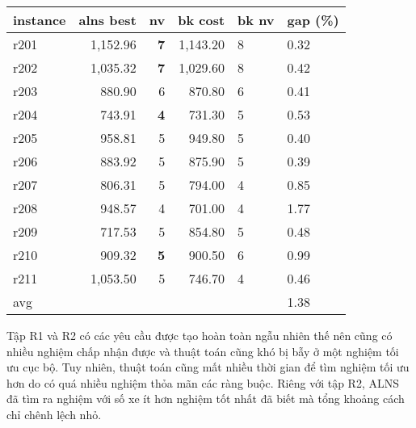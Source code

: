   \begin{table}[caption={Kết quả đo với tập Solomon R2}, label=exp:solomonR2]
    \centering
    \begin{tabular}{lrrrll}
    \hline
    instance & alns best & nv & bk cost & bk nv & gap (\%) \\ \hline
    r201 & 1,152.96 & \textbf{7} & 1,143.20 & 8 & 0.32 \\ \hline
    r202 & 1,035.32 & \textbf{7} & 1,029.60 & 8 & 0.42 \\ \hline
    r203 & 880.90 & 6 & 870.80 & 6 & 0.41 \\ \hline
    r204 & 743.91 & \textbf{4} & 731.30 & 5 & 0.53 \\ \hline
    r205 & 958.81 & 5 & 949.80 & 5 & 0.40 \\ \hline
    r206 & 883.92 & 5 & 875.90 & 5 & 0.39 \\ \hline
    r207 & 806.31 & 5 & 794.00 & 4 & 0.85 \\ \hline
    r208 & 948.57 & 4 & 701.00 & 4 & 1.77 \\ \hline
    r209 & 717.53 & 5 & 854.80 & 5 & 0.48 \\ \hline
    r210 & 909.32 & \textbf{5} & 900.50 & 6 & 0.99 \\ \hline
    r211 & 1,053.50 & 5 & 746.70 & 4 & 0.46 \\ \hline
    avg &  &  &  &  & 1.38 \\ \hline
    \end{tabular}
  \end{table}

  Tập R1 và R2 có các yêu cầu được tạo hoàn toàn ngẫu nhiên thế nên cũng có nhiều nghiệm chấp nhận được và thuật toán cũng khó bị bẫy ở một nghiệm tối ưu cục bộ. Tuy nhiên, thuật toán cũng mất nhiều thời gian để tìm nghiệm tối ưu hơn do có quá nhiều nghiệm thỏa mãn các ràng buộc. Riêng với tập R2, ALNS đã tìm ra nghiệm với số xe ít hơn nghiệm tốt nhất đã biết mà tổng khoảng cách chỉ chênh lệch nhỏ. 

